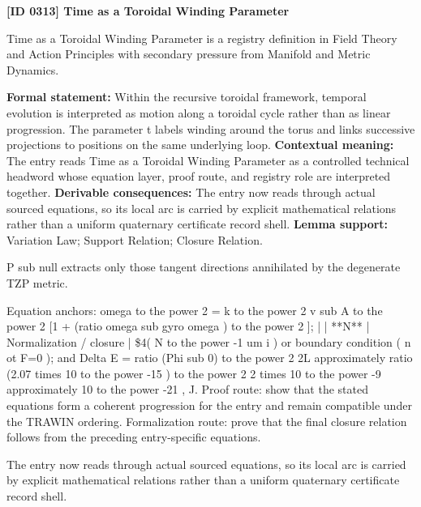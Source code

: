 \clearpage
\noindent\textbf{[ID 0313] Time as a Toroidal Winding Parameter}\par
\vspace{0.35em}
\begingroup\small
{}
Time as a Toroidal Winding Parameter is a registry definition in Field Theory and Action Principles with secondary pressure from Manifold and Metric Dynamics.

\begingroup\footnotesize\setlength{\emergencystretch}{3em}\sloppy
\textbf{Formal statement:} Within the recursive toroidal framework, temporal evolution is interpreted as motion along a toroidal cycle rather than as linear progression. The parameter t labels winding around the torus and links successive projections to positions on the same underlying loop. \textbf{Contextual meaning:} The entry reads Time as a Toroidal Winding Parameter as a controlled technical headword whose equation layer, proof route, and registry role are interpreted together. \textbf{Derivable consequences:} The entry now reads through actual sourced equations, so its local arc is carried by explicit mathematical relations rather than a uniform quaternary certificate record shell. \textbf{Lemma support:} Variation Law; Support Relation; Closure Relation.\par
\endgroup

P sub null extracts only those tangent directions annihilated by the degenerate TZP metric.

Equation anchors: omega to the power 2 = k to the power 2 v sub A to the power 2 [1 + (ratio omega sub gyro omega ) to the power 2 ]; | | **N** | Normalization / closure | \$4( N to the power -1 um i ) or boundary condition ( n ot F=0 ); and Delta E = ratio (Phi sub 0) to the power 2 2L approximately ratio (2.07 times 10 to the power -15 ) to the power 2 2 times 10 to the power -9 approximately 10 to the power -21 , J. Proof route: show that the stated equations form a coherent progression for the entry and remain compatible under the TRAWIN ordering. Formalization route: prove that the final closure relation follows from the preceding entry-specific equations.

The entry now reads through actual sourced equations, so its local arc is carried by explicit mathematical relations rather than a uniform quaternary certificate record shell.
\endgroup

